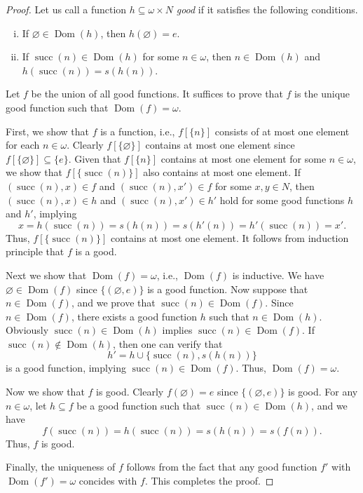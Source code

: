 \documentclass[11pt]{article}
\DeclareMathOperator{\dom}{Dom}
\DeclareMathOperator{\suc}{succ}
\begin{document}
\begin{proof}
  Let us call a function $h \subseteq \omega \times N$ \emph{good} if it satisfies the following conditions.
  \begin{enumerate}[(i)]
    \item If $\varnothing \in \dom(h)$, then $h(\varnothing) = e$.
    \item If $\suc(n) \in \dom(h)$ for some $n \in \omega$, then $n \in \dom(h)$ and $h(\suc(n)) = s(h(n))$.
  \end{enumerate}
  Let $f$ be the union of all good functions.
  It suffices to prove that $f$ is the unique good function such that $\dom(f) = \omega$.
  \par First, we show that $f$ is a function, i.e., $f[\{n\}]$ consists of at most one element for each $n \in \omega$.
  Clearly $f[\{\varnothing\}]$ contains at most one element since $f[\{\varnothing\}] \subseteq \{e\}$.
  Given that $f[\{n\}]$ contains at most one element for some $n \in \omega$, we show that $f[\{\suc(n)\}]$ also contains at most one element.
  If $(\suc(n), x) \in f$ and $(\suc(n), x') \in f$ for some $x, y \in N$, then $(\suc(n), x) \in h$ and $(\suc(n), x') \in h'$ hold for some good functions $h$ and $h'$, implying
  \begin{equation*}
    x = h(\suc(n)) = s(h(n)) = s(h'(n)) = h'(\suc(n)) = x'.
  \end{equation*}
  Thus, $f[\{\suc(n)\}]$ contains at most one element.
  It follows from induction principle that $f$ is a good.
  \par Next we show that $\dom(f) = \omega$, i.e., $\dom(f)$ is inductive.
  We have $\varnothing \in \dom(f)$ since $\{(\varnothing, e)\}$ is a good function.
  Now suppose that $n \in \dom(f)$, and we prove that $\suc(n) \in \dom(f)$.
  Since $n \in \dom(f)$, there exists a good function $h$ such that $n \in \dom(h)$.
  Obviously $\suc(n) \in \dom(h)$ implies $\suc(n) \in \dom(f)$.
  If $\suc(n) \notin \dom(h)$, then one can verify that
  \begin{equation*}
    h' = h \cup \{\suc(n), s(h(n))\}
  \end{equation*}
  is a good function, implying $\suc(n) \in \dom(f)$.
  Thus, $\dom(f) = \omega$.
  \par Now we show that $f$ is good.
  Clearly $f(\varnothing) = e$ since $\{(\varnothing, e)\}$ is good.
  For any $n \in \omega$, let $h \subseteq f$ be a good function such that $\suc(n) \in \dom(h)$, and we have
  \begin{equation*}
    f(\suc(n)) = h(\suc(n)) = s(h(n)) = s(f(n)).
  \end{equation*}
  Thus, $f$ is good.
  \par Finally, the uniqueness of $f$ follows from the fact that any good function $f'$ with $\dom(f') = \omega$ concides with $f$.
  This completes the proof.
\end{proof}
\end{document}
